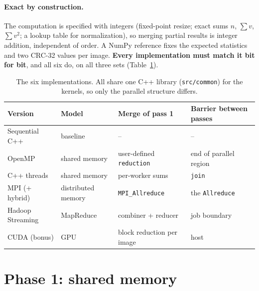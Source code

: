\documentclass{zc-ust-hw}
\begin{document}
\paragraph{Exact by construction.} The computation is specified with integers (fixed-point
resize; exact sums $n$, $\sum v$, $\sum v^2$; a lookup table for normalization), so merging
partial results is integer addition, independent of order. A NumPy reference fixes the expected
statistics and two CRC-32 values per image. \textbf{Every implementation must match it bit for
bit}, and all six do, on all three sets (Table~\ref{tab:models}).

\begin{table}[H]
\centering\small\setlength{\tabcolsep}{5pt}
\begin{tabular}{llll}
\toprule
Version & Model & Merge of pass 1 & Barrier between passes \\
\midrule
Sequential C++ & baseline & -- & -- \\
OpenMP & shared memory & user-defined \texttt{reduction} & end of parallel region \\
C++ threads & shared memory & per-worker sums & \texttt{join} \\
MPI (+ hybrid) & distributed memory & \texttt{MPI\_Allreduce} & the \texttt{Allreduce} \\
Hadoop Streaming & MapReduce & combiner + reducer & job boundary \\
CUDA (bonus) & GPU & block reduction per image & host \\
\bottomrule
\end{tabular}
\caption{The six implementations. All share one C++ library (\texttt{src/common}) for the
kernels, so only the parallel structure differs.}
\label{tab:models}
\end{table}

\section{Phase 1: shared memory}
\end{document}
